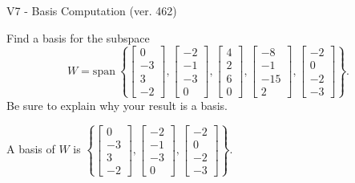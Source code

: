 \begin{exercise}
  \begin{exerciseTitle}V7 - Basis Computation (ver. 462)\end{exerciseTitle}
  \begin{exerciseStatement}
    Find a basis for the subspace 
\[W=\mathrm{span}\ \left\{\left[\begin{array}{r}
0 \\
-3 \\
3 \\
-2
\end{array}\right] , \left[\begin{array}{r}
-2 \\
-1 \\
-3 \\
0
\end{array}\right] , \left[\begin{array}{r}
4 \\
2 \\
6 \\
0
\end{array}\right] , \left[\begin{array}{r}
-8 \\
-1 \\
-15 \\
2
\end{array}\right] , \left[\begin{array}{r}
-2 \\
0 \\
-2 \\
-3
\end{array}\right]\right\}.\]
 Be sure to explain why your result is a basis.


  \end{exerciseStatement}
  \begin{exerciseAnswer}
   A basis of \(W\) is  \(\left\{\left[\begin{array}{r}
0 \\
-3 \\
3 \\
-2
\end{array}\right] , \left[\begin{array}{r}
-2 \\
-1 \\
-3 \\
0
\end{array}\right] , \left[\begin{array}{r}
-2 \\
0 \\
-2 \\
-3
\end{array}\right]\right\}\).
  


  \end{exerciseAnswer}
\end{exercise}